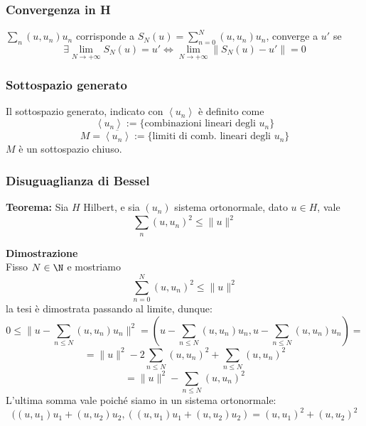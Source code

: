 \subsubsection{Convergenza in H}
$\sum_{n}^{} (u,u_n)u_n $ corrisponde a $S_N(u)=\sum_{n=0}^{N} (u,u_n)u_n$, converge a $u'$ se 
\[\exists \lim_{N \to +\infty} S_N(u)=u' \iff \lim_{N \to +\infty} \|S_N(u)-u'\|=0\]
\subsubsection{Sottospazio generato}
Il sottospazio generato, indicato con $\left< u_n \right> $ è definito come
\[\left< u_n \right> :=\{\text{combinazioni lineari degli }u_n\} \]
\[M=\overline{\left< u_n \right> }:=\{\text{limiti di comb. lineari degli }u_n\} \]
$M$ è un sottospazio chiuso.
\subsubsection{Disuguaglianza di Bessel}
\begin{tcolorbox}
	\textbf{Teorema: }Sia $H$ Hilbert, e sia $(u_n)$ sistema ortonormale, dato $u\in H$, vale 
	\[\sum_{n}^{} (u,u_n)^2\le \|u\|^2\]
\end{tcolorbox}
\textbf{Dimostrazione} 
\\Fisso $N\in \N$ e mostriamo
\[\sum_{n=0}^{N} (u,u_n)^2\le \|u\|^2\]
la tesi è dimostrata passando al limite, dunque:
\[0\le \|u-\sum_{n\le N}^{} (u,u_n)u_n\|^2=(u-\sum_{n\le N}^{} (u,u_n)u_n,u-\sum_{n\le N}^{} (u,u_n)u_n)=\]
\[=\|u\|^2 -2 \sum_{n\le N}^{} (u,u_n)^2+\sum_{n\le N}^{} (u,u_n)^2\]
\[=\|u\|^2-\sum_{n\le N}^{} (u,u_n)^2\]
L'ultima somma vale poiché siamo in un sistema ortonormale:
\[((u,u_1)u_1+(u,u_2)u_2,((u,u_1)u_1+(u,u_2)u_2)=(u,u_1)^2+(u,u_2)^2\]
